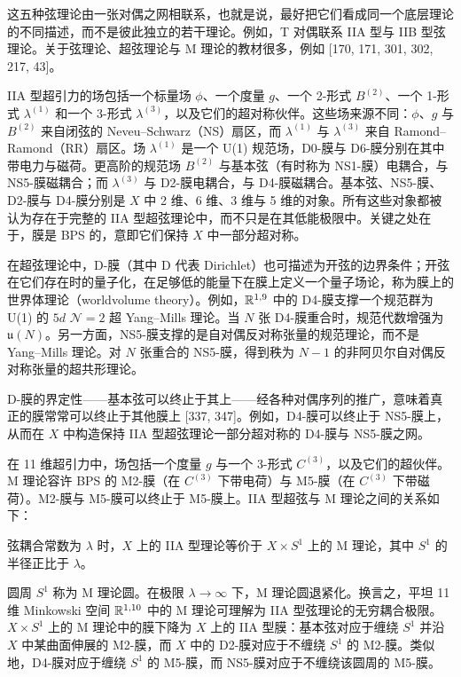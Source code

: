 这五种弦理论由一张对偶之网相联系，也就是说，最好把它们看成同一个底层理论的不同描述，而不是彼此独立的若干理论。例如，T 对偶联系 IIA 型与 IIB 型弦理论。关于弦理论、超弦理论与 M 理论的教材很多，例如 [170, 171, 301, 302, 217, 43]。

IIA 型超引力的场包括一个标量场 $\phi$、一个度量 $g$、一个 2-形式 $B^{(2)}$、一个 1-形式 $\lambda^{(1)}$ 和一个 3-形式 $\lambda^{(3)}$，以及它们的超对称伙伴。这些场来源不同：$\phi$、$g$ 与 $B^{(2)}$ 来自闭弦的 Neveu–Schwarz（NS）扇区，而 $\lambda^{(1)}$ 与 $\lambda^{(3)}$ 来自 Ramond–Ramond（RR）扇区。场 $\lambda^{(1)}$ 是一个 U(1) 规范场，D0-膜与 D6-膜分别在其中带电力与磁荷。更高阶的规范场 $B^{(2)}$ 与基本弦（有时称为 NS1-膜）电耦合，与 NS5-膜磁耦合；而 $\lambda^{(3)}$ 与 D2-膜电耦合，与 D4-膜磁耦合。基本弦、NS5-膜、D2-膜与 D4-膜分别是 $X$ 中 2 维、6 维、3 维与 5 维的对象。所有这些对象都被认为存在于完整的 IIA 型超弦理论中，而不只是在其低能极限中。关键之处在于，膜是 BPS 的，意即它们保持 $X$ 中一部分超对称。

在超弦理论中，D-膜（其中 D 代表 Dirichlet）也可描述为开弦的边界条件；开弦在它们存在时的量子化，在足够低的能量下在膜上定义一个量子场论，称为膜上的世界体理论（worldvolume theory）。例如，$\mathbb{R}^{1,9}$ 中的 D4-膜支撑一个规范群为 U(1) 的 $5d$ $\mathcal{N}=2$ 超 Yang–Mills 理论。当 $N$ 张 D4-膜重合时，规范代数增强为 $\mathfrak{u}(N)$。另一方面，NS5-膜支撑的是自对偶反对称张量的规范理论，而不是
Yang–Mills 理论。对 $N$ 张重合的 NS5-膜，得到秩为 $N-1$ 的非阿贝尔自对偶反对称张量的超共形理论。

D-膜的界定性——基本弦可以终止于其上——经各种对偶序列的推广，意味着真正的膜常常可以终止于其他膜上 [337, 347]。例如，D4-膜可以终止于 NS5-膜上，从而在 $X$ 中构造保持 IIA 型超弦理论一部分超对称的 D4-膜与 NS5-膜之网。

在 11 维超引力中，场包括一个度量 $g$ 与一个 3-形式 $C^{(3)}$，以及它们的超伙伴。M 理论容许 BPS 的 M2-膜（在 $C^{(3)}$ 下带电荷）与 M5-膜（在 $C^{(3)}$ 下带磁荷）。M2-膜与 M5-膜可以终止于 M5-膜上。IIA 型超弦与 M 理论之间的关系如下：

\begin{proposition}[21.1] 弦耦合常数为 $\lambda$ 时，$X$ 上的 IIA 型理论等价于 $X\times S^1$ 上的 M 理论，其中 $S^1$ 的半径正比于 $\lambda$。\end{proposition}

圆周 $S^1$ 称为 M 理论圆。在极限 $\lambda\to\infty$ 下，M 理论圆退紧化。换言之，平坦 11 维 Minkowski 空间 $\mathbb{R}^{1,10}$ 中的 M 理论可理解为 IIA 型弦理论的无穷耦合极限。$X\times S^1$ 上的 M 理论中的膜下降为 $X$ 上的 IIA 型膜：基本弦对应于缠绕 $S^1$ 并沿 $X$ 中某曲面伸展的 M2-膜，而 $X$ 中的 D2-膜对应于不缠绕 $S^1$ 的 M2-膜。类似地，D4-膜对应于缠绕 $S^1$ 的 M5-膜，而 NS5-膜对应于不缠绕该圆周的 M5-膜。

